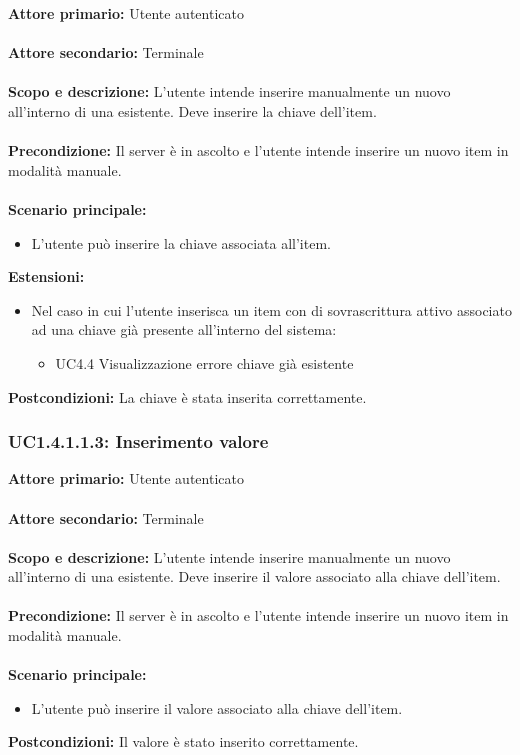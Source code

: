\documentclass{scalatekids-article}
\begin{document}
\textbf{Attore primario:} Utente autenticato\\ \\
\textbf{Attore secondario:} Terminale\\ \\
\textbf{Scopo e descrizione:} L'utente intende inserire manualmente un nuovo  all'interno di una  esistente. Deve inserire la chiave dell'item.\\ \\
\textbf{Precondizione:} Il server è in ascolto e l'utente intende inserire un nuovo item in modalità manuale.\\ \\
\textbf{Scenario principale:}
\begin{itemize}
\item L'utente può inserire la chiave associata all'item.
\end{itemize}
\textbf{Estensioni:}
\begin{itemize}
\item Nel caso in cui l'utente inserisca un item con  di sovrascrittura attivo associato ad una chiave già presente all'interno del sistema:
  \begin{itemize}
  \item UC4.4 Visualizzazione errore chiave già esistente
  \end{itemize}
\end{itemize}
\textbf{Postcondizioni:} La chiave è stata inserita correttamente.

\subsubsection{UC1.4.1.1.3: Inserimento valore}

\textbf{Attore primario:} Utente autenticato\\ \\
\textbf{Attore secondario:} Terminale\\ \\
\textbf{Scopo e descrizione:} L'utente intende inserire manualmente un nuovo  all'interno di una  esistente. Deve inserire il valore associato alla chiave dell'item.\\ \\
\textbf{Precondizione:} Il server è in ascolto e l'utente intende inserire un nuovo item in modalità manuale.\\ \\
\textbf{Scenario principale:}
\begin{itemize}
\item L'utente può inserire il valore associato alla chiave dell'item.
\end{itemize}
\textbf{Postcondizioni:} Il valore è stato inserito correttamente.
\end{document}
